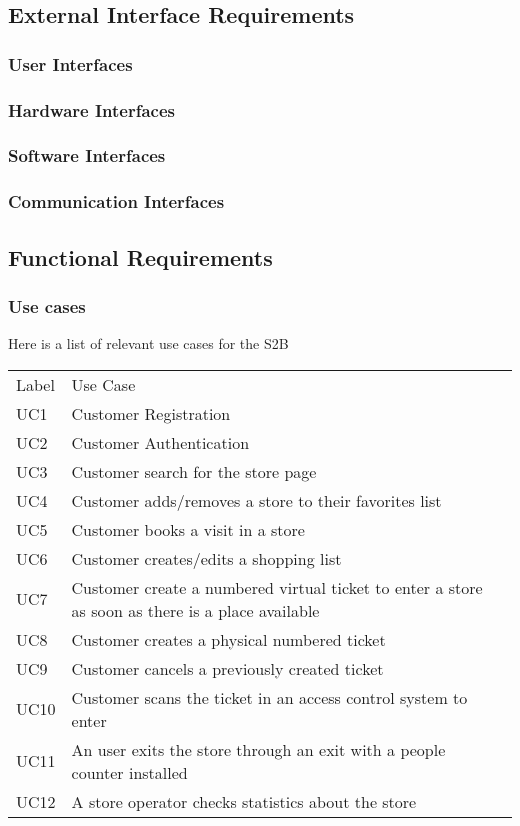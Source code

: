 \subsection{External Interface Requirements}
\subsubsection{User Interfaces}
\subsubsection{Hardware Interfaces}
\subsubsection{Software Interfaces}
\subsubsection{Communication Interfaces}
\subsection{Functional Requirements}
\subsubsection{Use cases}
    Here is a list of relevant use cases for the S2B
    \smallskip
    
    \renewcommand{\arraystretch}{1.4}
    \begin{tabular}{C{2cm}L{10.5cm}C{2.6cm}}
        Label & Use Case       \\
        UC1 & Customer Registration \\
        UC2 & Customer Authentication \\
        UC3 & Customer search for the store page\\
        UC4 & Customer adds/removes a store to their favorites list\\
        UC5 & Customer books a visit in a store \\
        UC6 & Customer creates/edits a shopping list \\
        UC7 & Customer create a numbered virtual ticket to enter a store as soon as there is a place available \\
        UC8 & Customer creates a physical numbered ticket \\
        UC9 & Customer cancels a previously created ticket \\
        UC10 & Customer scans the ticket in an access control system to enter \\
        UC11 & An user exits the store through an exit with a people counter installed \\
        UC12 & A store operator checks statistics about the store\\

    \end{tabular}
    

